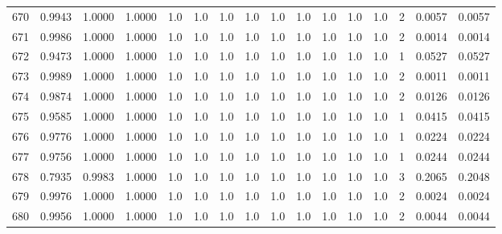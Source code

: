\begin{tabular}{lrrrrrrrrrrrrrrr}
670 &      0.9943 &  1.0000 &  1.0000 &     1.0 &     1.0 &     1.0 &     1.0 &     1.0 &     1.0 &     1.0 &      1.0 &        1.0 &      2 &                    0.0057 &                     0.0057 \\
671 &      0.9986 &  1.0000 &  1.0000 &     1.0 &     1.0 &     1.0 &     1.0 &     1.0 &     1.0 &     1.0 &      1.0 &        1.0 &      2 &                    0.0014 &                     0.0014 \\
672 &      0.9473 &  1.0000 &  1.0000 &     1.0 &     1.0 &     1.0 &     1.0 &     1.0 &     1.0 &     1.0 &      1.0 &        1.0 &      1 &                    0.0527 &                     0.0527 \\
673 &      0.9989 &  1.0000 &  1.0000 &     1.0 &     1.0 &     1.0 &     1.0 &     1.0 &     1.0 &     1.0 &      1.0 &        1.0 &      2 &                    0.0011 &                     0.0011 \\
674 &      0.9874 &  1.0000 &  1.0000 &     1.0 &     1.0 &     1.0 &     1.0 &     1.0 &     1.0 &     1.0 &      1.0 &        1.0 &      2 &                    0.0126 &                     0.0126 \\
675 &      0.9585 &  1.0000 &  1.0000 &     1.0 &     1.0 &     1.0 &     1.0 &     1.0 &     1.0 &     1.0 &      1.0 &        1.0 &      1 &                    0.0415 &                     0.0415 \\
676 &      0.9776 &  1.0000 &  1.0000 &     1.0 &     1.0 &     1.0 &     1.0 &     1.0 &     1.0 &     1.0 &      1.0 &        1.0 &      1 &                    0.0224 &                     0.0224 \\
677 &      0.9756 &  1.0000 &  1.0000 &     1.0 &     1.0 &     1.0 &     1.0 &     1.0 &     1.0 &     1.0 &      1.0 &        1.0 &      1 &                    0.0244 &                     0.0244 \\
678 &      0.7935 &  0.9983 &  1.0000 &     1.0 &     1.0 &     1.0 &     1.0 &     1.0 &     1.0 &     1.0 &      1.0 &        1.0 &      3 &                    0.2065 &                     0.2048 \\
679 &      0.9976 &  1.0000 &  1.0000 &     1.0 &     1.0 &     1.0 &     1.0 &     1.0 &     1.0 &     1.0 &      1.0 &        1.0 &      2 &                    0.0024 &                     0.0024 \\
680 &      0.9956 &  1.0000 &  1.0000 &     1.0 &     1.0 &     1.0 &     1.0 &     1.0 &     1.0 &     1.0 &      1.0 &        1.0 &      2 &                    0.0044 &                     0.0044 \\

\end{tabular}
